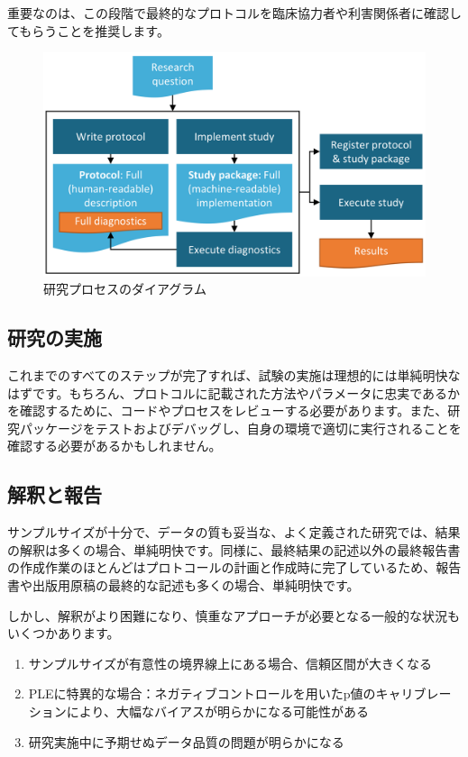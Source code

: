 \documentclass[
  11pt]{book}
\theoremstyle{definition}
\theoremstyle{definition}
\theoremstyle{definition}
\theoremstyle{definition}
\theoremstyle{remark}
\begin{document}
重要なのは、この段階で最終的なプロトコルを臨床協力者や利害関係者に確認してもらうことを推奨します。

\begin{figure}

{\centering \includegraphics[width=0.9\linewidth]{images/StudySteps/studyProcess} 

}

\caption{研究プロセスのダイアグラム}\label{fig:studyProcess}
\end{figure}

\subsection{研究の実施}\label{ux7814ux7a76ux306eux5b9fux65bd}

これまでのすべてのステップが完了すれば、試験の実施は理想的には単純明快なはずです。もちろん、プロトコルに記載された方法やパラメータに忠実であるかを確認するために、コードやプロセスをレビューする必要があります。また、研究パッケージをテストおよびデバッグし、自身の環境で適切に実行されることを確認する必要があるかもしれません。

\subsection{解釈と報告}\label{ux89e3ux91c8ux3068ux5831ux544a}

サンプルサイズが十分で、データの質も妥当な、よく定義された研究では、結果の解釈は多くの場合、単純明快です。同様に、最終結果の記述以外の最終報告書の作成作業のほとんどはプロトコールの計画と作成時に完了しているため、報告書や出版用原稿の最終的な記述も多くの場合、単純明快です。

しかし、解釈がより困難になり、慎重なアプローチが必要となる一般的な状況もいくつかあります。

\begin{enumerate}
\def\labelenumi{\arabic{enumi}.}
\item
  サンプルサイズが有意性の境界線上にある場合、信頼区間が大きくなる
\item
  PLEに特異的な場合：ネガティブコントロールを用いたp値のキャリブレーションにより、大幅なバイアスが明らかになる可能性がある
\item
  研究実施中に予期せぬデータ品質の問題が明らかになる
\end{enumerate}
\end{document}
